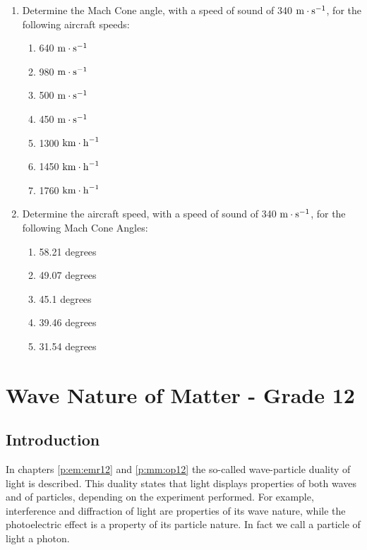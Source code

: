 \begin{enumerate}
\item Determine the Mach Cone angle, with a speed of sound of 340 $\rm{m\cdot s}^{-1}$, for the following aircraft speeds:
\begin{enumerate}
\item 640 $\rm{m\cdot s}^{-1}$
\item 980 $\rm{m\cdot s}^{-1}$
\item 500 $\rm{m\cdot s}^{-1}$
\item 450 $\rm{m\cdot s}^{-1}$
\item 1300 $\rm{km\cdot h}^{-1}$
\item 1450 $\rm{km\cdot h}^{-1}$
\item 1760 $\rm{km\cdot h}^{-1}$
\end{enumerate}
\item Determine the aircraft speed, with a speed of sound of 340 $\rm{m\cdot s}^{-1}$, for the following Mach Cone Angles:
\begin{enumerate}
\item 58.21 degrees
\item 49.07 degrees
\item 45.1 degrees
\item 39.46 degrees
\item 31.54 degrees
\end{enumerate}
\end{enumerate}






\chapter{Wave Nature of Matter - Grade 12}
\label{p:wsl:wnm12}

\section{Introduction}

In chapters \ref{p:em:emr12} and \ref{p:mm:op12} the so-called wave-particle duality of light is described. This duality states that light displays properties of both waves and of particles, depending on the experiment performed. For example, interference and diffraction of light are properties of its  wave nature, while the photoelectric effect is a property of its particle nature. In fact we call a particle of light a photon.

